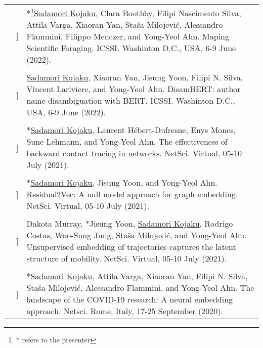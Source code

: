 \documentclass[letterpaper, 11pt]{article}
\newcounter{papercount}
\newcounter{papertype}
\newcommand{\changepapertype}{\setcounter{papercount}{0}\stepcounter{papertype}}
\newcommand{\paperitem}{%
\stepcounter{papercount}%
{\color{OliveGreen}{[\Alph{papertype}\thepapercount}]}
}
\begin{document}
\begin{longtable}{p{1.3in}p{2em}p{5.5in}}
    \changepapertype
    \nohyphens{\color{OliveGreen}{ORAL PRESENTATION (REFEREED) }}
                                                    &\paperitem & *\footnote{* refers to the presenter}\underline{Sadamori Kojaku}, Clara Boothby, Filipi Nascimento Silva, Attila Varga, Xiaoran Yan, Sta\v{s}a Milojevi\'{c}, Alessandro Flammini, Filippo Menczer, and Yong-Yeol Ahn.
                                                    Maping Scientific Foraging. ICSSI. Washinton D.C., USA, 6-9 June (2022).\\
                                                    & & \\
                                                    &\paperitem & \underline{Sadamori Kojaku}, Xiaoran Yan, Jisung Yoon, Filipi N. Silva, Vincent Lariviere, and Yong-Yeol Ahn.
                                                    DisamBERT: author name disambiguation with BERT. ICSSI. Washinton D.C., USA, 6-9 June (2022).\\
                                                    & & \\
                                                    &\paperitem & *\underline{Sadamori Kojaku}, Laurent H\'ebert-Dufresne, Enys Mones, Sune Lehmann, and Yong-Yeol Ahn.
                                                    The effectiveness of backward contact tracing in networks. NetSci. Virtual, 05-10 July (2021).\\
                                                    & & \\
                                                    &\paperitem & *\underline{Sadamori Kojaku}, Jisung Yoon, and Yong-Yeol Ahn.
                                                    Residual2Vec: A null model approach for graph embedding. NetSci. Virtual, 05-10 July (2021).\\
                                                    & & \\
                                                    &\paperitem & Dakota Murray, *Jisung Yoon, \underline{Sadamori Kojaku}, Rodrigo Costas, Woo-Sung Jung, Sta\v{s}a Milojevi\'{c}, and Yong-Yeol Ahn.
                                                    Unsupervised embedding of trajectories captures the latent structure of mobility.  NetSci. Virtual, 05-10 July (2021). \\
                                                    & & \\
                                                    &\paperitem & *\underline{Sadamori Kojaku}, Attila Varga, Xiaoran Yan, Filipi N. Silva, Staša Milojević, Alessandro Flammini, and Yong-Yeol Ahn. The landscape of the COVID-19 research: A neural embedding approach. Netsci. Rome, Italy, 17-25 September (2020).\\

\end{longtable}
\end{document}
